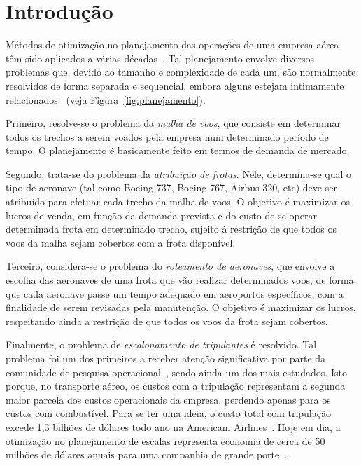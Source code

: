 \zerar
\chapter{Introdução}
\label{cap:introducao}

Métodos de otimização no planejamento das operações de uma empresa aérea têm sido aplicados a várias
décadas~\cite{yu}. Tal planejamento envolve diversos problemas que, devido ao tamanho e complexidade
de cada um, são normalmente resolvidos de forma separada e sequencial, embora alguns estejam
intimamente relacionados~\cite{barnhart03} (veja Figura~\ref{fig:planejamento}).

Primeiro, resolve-se o problema da \emph{malha de voos}, que consiste em determinar todos os trechos
a serem voados pela empresa num determinado período de tempo. O planejamento é basicamente feito em
termos de demanda de mercado.

Segundo, trata-se do problema da \emph{atribuição de frotas}. Nele, determina-se qual o tipo de
aeronave (tal como Boeing 737, Boeing 767, Airbus 320, etc) deve ser atribuído para efetuar cada
trecho da malha de voos. O objetivo é maximizar os lucros de venda, em função da demanda prevista e
do custo de se operar determinada frota em determinado trecho, sujeito à restrição de que todos os
voos da malha sejam cobertos com a frota disponível.

Terceiro, considera-se o problema do \emph{roteamento de aeronaves}, que envolve a escolha das
aeronaves de uma frota que vão realizar determinados voos, de forma que cada aeronave passe um tempo
adequado em aeroportos específicos, com a finalidade de serem revisadas pela manutenção. O objetivo
é maximizar os lucros, respeitando ainda a restrição de que todos os voos da frota sejam cobertos.

Finalmente, o problema de \emph{escalonamento de tripulantes} é resolvido. Tal problema foi um dos
primeiros a receber atenção significativa por parte da comunidade de pesquisa
operacional~\cite{arabeyre69}, sendo ainda um dos mais estudados. Isto porque, no transporte aéreo,
os custos com a tripulação representam a segunda maior parcela dos custos operacionais da empresa,
perdendo apenas para os custos com combustível. Para se ter uma ideia, o custo total com tripulação
excede 1,3 bilhões de dólares todo ano na Americam Airlines~\cite{anbil91a}. Hoje em dia, a
otimização no planejamento de escalas representa economia de cerca de 50 milhões de dólares anuais
para uma companhia de grande porte~\cite{barnhart03}.

